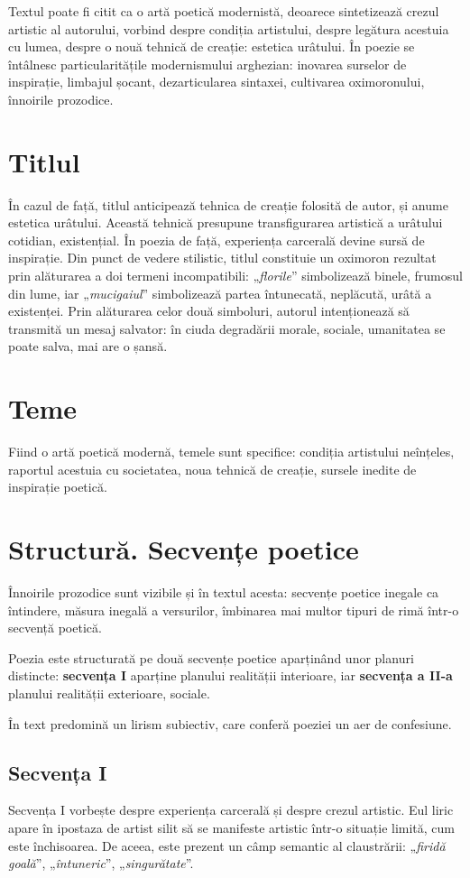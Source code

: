 \documentclass{article}
\newcommand{\qu}[1]{„\emph{#1}”}
\begin{document}
Textul poate fi citit ca o artă poetică modernistă, deoarece sintetizează crezul artistic al autorului, vorbind despre condiția artistului, despre legătura acestuia cu lumea, despre o nouă tehnică de creație: estetica urâtului. În poezie se întâlnesc particularitățile modernismului arghezian: inovarea surselor de inspirație, limbajul șocant, dezarticularea sintaxei, cultivarea oximoronului, înnoirile prozodice.

\section{Titlul}
În cazul de față, titlul anticipează tehnica de creație folosită de autor, și anume estetica urâtului. Această tehnică presupune transfigurarea artistică a urâtului cotidian, existențial. În poezia de față, experiența carcerală devine sursă de inspirație. Din punct de vedere stilistic, titlul constituie un oximoron rezultat prin alăturarea a doi termeni incompatibili: \qu{florile} simbolizează binele, frumosul din lume, iar \qu{mucigaiul} simbolizează partea întunecată, neplăcută, urâtă a existenței. Prin alăturarea celor două simboluri, autorul intenționează să transmită un mesaj salvator: în ciuda degradării morale, sociale, umanitatea se poate salva, mai are o șansă.

\section{Teme}
Fiind o artă poetică modernă, temele sunt specifice: condiția artistului neînțeles, raportul acestuia cu societatea, noua tehnică de creație, sursele inedite de inspirație poetică.

\section{Structură. Secvențe poetice}
Înnoirile prozodice sunt vizibile și în textul acesta: secvențe poetice inegale ca întindere, măsura inegală a versurilor, îmbinarea mai multor tipuri de rimă într-o secvență poetică.

Poezia este structurată pe două secvențe poetice aparținând unor planuri distincte: \textbf{secvența I} aparține planului realității interioare, iar \textbf{secvența a II-a} planului realității exterioare, sociale.

În text predomină un lirism subiectiv, care conferă poeziei un aer de confesiune.

\subsection{Secvența I}
Secvența I vorbește despre experiența carcerală și despre crezul artistic. Eul liric apare în ipostaza de artist silit să se manifeste artistic într-o situație limită, cum este închisoarea. De aceea, este prezent un câmp semantic al claustrării: \qu{firidă goală}, \qu{întuneric}, \qu{singurătate}.
\end{document}
